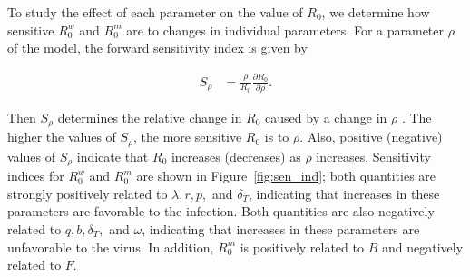 \documentclass[11pt, oneside]{article}    %
\begin{document}
\vspace{5mm}

To study the effect of each parameter on the value of $R_0$, we determine how sensitive $R_0^w$ and $R_0^m$ are to changes in individual parameters. For a parameter $\rho$ of the model, the forward sensitivity index is given by 

\begin{align*}
S_\rho & = \frac{\rho}{R_0}\frac{\partial R_0}{\partial \rho}.
\end{align*}

Then $S_{\rho}$ determines the relative change in $R_0$ caused by a change in $\rho$ \cite{Marino, Perera, Rodrigues}. The higher the values of $S_\rho$, the more sensitive $R_0$ is to $\rho$. Also, positive (negative) values of $S_{\rho}$ indicate that $R_0$ increases (decreases) as $\rho$ increases. Sensitivity indices for $R_0^w$ and $R_0^m$ are shown in Figure~\ref{fig:sen_ind}; both quantities are strongly positively related to $\lambda, r, p,$ and $\delta_T$, indicating that increases in these parameters are favorable to the infection. Both quantities are also negatively related to $q, b, \delta_T,$ and $\omega$, indicating that increases in these parameters are unfavorable to the virus. In addition, $R_0^m$ is positively related to $B$ and negatively related to $F$.
\end{document}

